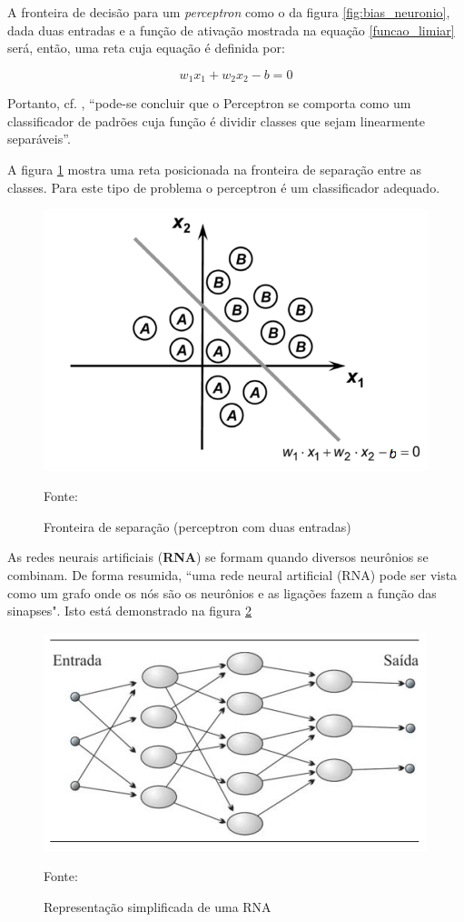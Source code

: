 A fronteira de decisão para um \textit{perceptron} como o da figura \ref{fig:bias_neuronio}, dada duas entradas e a função de ativação mostrada na equação \ref{funcao_limiar} será, então, uma reta cuja equação é definida por: 

\begin{equation}\label{eq_reta}
	w_1x_1 + w_2x_2 - b = 0
\end{equation}

Portanto, cf. \cite{silva_redes_2016}, ``pode-se concluir que o Perceptron se comporta como um classificador de padrões cuja função é dividir classes que sejam linearmente separáveis''.

A figura \ref{fig:linearmente_separavel} mostra uma reta posicionada na fronteira de separação entre as classes. Para este tipo de problema o perceptron é um classificador adequado.

\begin{figure}[h!]
	\centering
	\includegraphics[width=.7\textwidth]{imagens/linearmente_separavel.png}	
	\caption{Fronteira de separação (perceptron com duas entradas)}
	{\scriptsize 	Fonte: \cite[p. 62]{silva_redes_2016}}
	\label{fig:linearmente_separavel}
\end{figure}

As redes neurais artificiais (\textbf{RNA}) se formam quando diversos neurônios se combinam. De forma resumida, ``uma rede neural artificial (RNA) pode ser vista como um grafo onde os nós são os neurônios e as ligações fazem a função das sinapses". Isto está demonstrado na figura \ref{fig:rna}

\begin{figure}[h!]
	\centering
	\includegraphics[width=.7\textwidth]{imagens/RNA.png}	
	\caption{Representação simplificada de uma RNA}
	{\scriptsize 	Fonte: \cite[p.26]{ferneda_redes_2006}}
	\label{fig:rna}
\end{figure}


